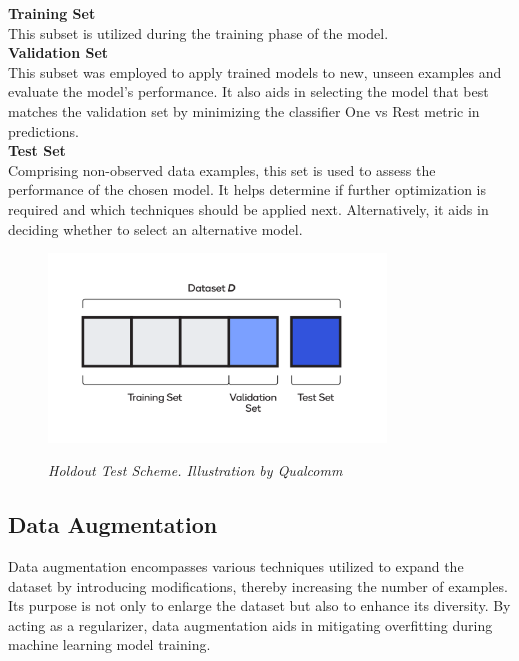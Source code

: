 \vspace{0.5cm}
\textbf{Training Set} \\

This subset is utilized during the training phase of the model. \\

\vspace{0.5cm}
\textbf{Validation Set} \\

This subset was employed to apply trained models to new, unseen examples and evaluate the model's performance. It also aids in selecting the model that best matches the validation set by minimizing the classifier One vs Rest metric in predictions. \\

\vspace{0.5cm}
\textbf{Test Set} \\

Comprising non-observed data examples, this set is used to assess the performance of the chosen model. It helps determine if further optimization is required and which techniques should be applied next. Alternatively, it aids in deciding whether to select an alternative model.


\begin{figure}[H]
\centering
\includegraphics[width=0.8\textwidth]{imatges/preliminaries/train-test-validation-sets.png}
\caption[Holdout Test Scheme]{\textit{Holdout Test Scheme. Illustration by Qualcomm}}
{\label{fig:holdout-test-scheme}}
\end{figure}

\newpage

\subsection{Data Augmentation}

Data augmentation encompasses various techniques utilized to expand the dataset by introducing modifications, thereby increasing the number of examples. Its purpose is not only to enlarge the dataset but also to enhance its diversity. By acting as a regularizer, data augmentation aids in mitigating overfitting during machine learning model training.


